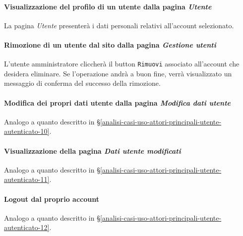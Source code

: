 \paragraph{Visualizzazione del profilo di un utente dalla pagina \textit{Utente}}
\label{analisi-casi-uso-attori-principali-utente-amministratore-18}
La pagina \textit{Utente} presenterà i dati personali relativi all'account selezionato.


\paragraph{Rimozione di un utente dal sito dalla pagina \textit{Gestione utenti}}
\label{analisi-casi-uso-attori-principali-utente-amministratore-19}
L'utente amministratore cliccherà il button \texttt{Rimuovi} associato all'account che desidera eliminare. Se l'operazione andrà a buon fine, verrà visualizzato un messaggio di conferma del successo della rimozione.


\paragraph{Modifica dei propri dati utente dalla pagina \textit{Modifica dati utente}}
\label{analisi-casi-uso-attori-principali-utente-amministratore-20}
Analogo a quanto descritto in §\ref{analisi-casi-uso-attori-principali-utente-autenticato-10}.


\paragraph{Visualizzazione della pagina \textit{Dati utente modificati}}
\label{analisi-casi-uso-attori-principali-utente-amministratore-21}
Analogo a quanto descritto in §\ref{analisi-casi-uso-attori-principali-utente-autenticato-11}.


\paragraph{Logout dal proprio account}
\label{analisi-casi-uso-attori-principali-utente-amministratore-22}
Analogo a quanto descritto in §\ref{analisi-casi-uso-attori-principali-utente-autenticato-12}.